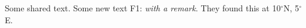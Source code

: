 \documentclass{article}
\newcommand{\degree}{$^\circ$}
\newcommand{\remark}[1]{\textsf{\small F1: \emph{#1}}}
\begin{document}
Some shared text.
Some new text \remark{with a remark}. They found this at 10\degree N, 5\degree E.
\end{document}

